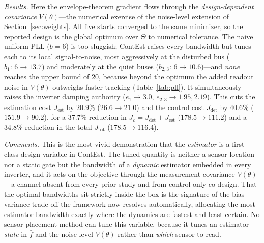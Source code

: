 \documentclass[twocolumn,amsthm]{autart}
\begin{document}
\emph{Results.} Here the envelope-theorem gradient flows through the
\emph{design-dependent covariance} $V(\theta)$---the numerical exercise of the
noise-level extension of Section~\ref{sec:weights}. All five starts converged to the same minimizer, so the
reported design is the global optimum over $\Theta$ to numerical tolerance. The
naive uniform PLL ($b=6$) is too sluggish; ContEst raises every bandwidth but
tunes each to its local signal-to-noise, most aggressively at the disturbed bus
($b_1\!:\,6\to13.7$) and moderately at the quiet buses
($b_{2,3}\!:\,6\to10.6$)---and \emph{none} reaches the upper bound of $20$,
because beyond the optimum the added readout noise in $V(\theta)$ outweighs faster
tracking (Table~\ref{tab:pll}). It simultaneously raises the
inverter damping authority ($e_1\to3.0$, $e_{2,3}\to1.95,2.19$). This cuts the
estimation cost $J_{\mathrm{est}}$ by $20.9\%$ ($26.6\to21.0$) and the control cost
$J_{\mathrm{det}}$ by $40.6\%$ ($151.9\to90.2$), for a $37.7\%$ reduction in
$J_c=J_{\mathrm{det}}+J_{\mathrm{est}}$ ($178.5\to111.2$) and a $34.8\%$ reduction in
the total $J_{\mathrm{tot}}$ ($178.5\to116.4$).

\emph{Comments.} This is the most vivid demonstration that the \emph{estimator} is
a first-class design variable in ContEst. The tuned quantity is neither a sensor
location nor a static gate but the bandwidth of a \emph{dynamic} estimator
embedded in every inverter, and it acts on the objective through the measurement
covariance $V(\theta)$---a channel absent from every prior study and from
control-only co-design. That the optimal bandwidths sit strictly inside the box is
the signature of the bias--variance trade-off the framework now resolves
automatically, allocating the most estimator bandwidth exactly where the dynamics
are fastest and least certain. No sensor-placement method can tune this variable,
because it tunes an estimator \emph{state} in $\bar f$ and the noise level
$V(\theta)$ rather than \emph{which} sensor to read.
\end{document}

